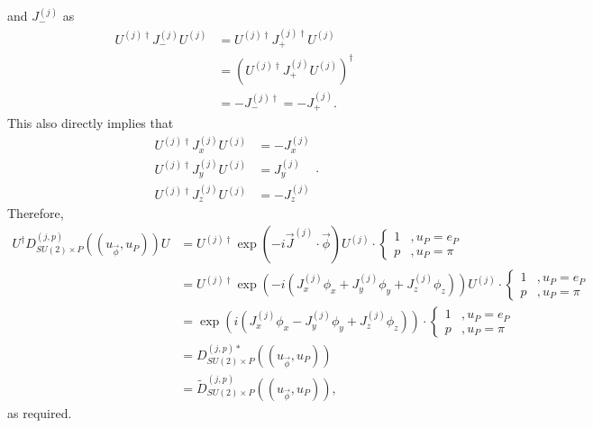 \documentclass[preprint, 12pt]{revtex4-2}
\numberwithin{equation}{section}
\begin{document}
and $J^{(j)}_-$ as
\begin{equation}\label{eq:Udagger J- U}
    \begin{aligned}
        U^{(j)\dagger}J_-^{(j)}U^{(j)} &= U^{(j)\dagger}J_+^{(j)\dagger}U^{(j)} \\
        &= \left(U^{(j)\dagger}J_+^{(j)}U^{(j)}\right)^\dagger \\
        &= -J_-^{(j)\dagger} = -J_+^{(j)}.
    \end{aligned}
\end{equation}
This also directly implies that
\begin{equation}\label{eq:Udagger Js U}
    \begin{aligned}
        U^{(j)\dagger}J_x^{(j)}U^{(j)} &= -J_x^{(j)} \\
        U^{(j)\dagger}J_y^{(j)}U^{(j)} &= J_y^{(j)} \\
        U^{(j)\dagger}J_z^{(j)}U^{(j)} &= -J_z^{(j)}
    \end{aligned}.
\end{equation}
Therefore,
\begin{equation}\label{eq:U basis theta basis equivalence}
    \begin{aligned}
        U^\dagger D_{SU(2)\times P}^{(j,p)}((u_{\vec{\phi}}, u_P))U &= U^{(j)\dagger}\exp(-i\vec{J}^{(j)}\cdot\vec{\phi})U^{(j)}\cdot \begin{cases}
            1 &, u_P = e_P \\
            p &, u_P = \pi
        \end{cases} \\ 
        &= U^{(j)\dagger}\exp(-i(J_x^{(j)}\phi_x+J_y^{(j)}\phi_y+J_z^{(j)}\phi_z))U^{(j)}\cdot \begin{cases}
            1 &, u_P = e_P \\
            p &, u_P = \pi
        \end{cases} \\
        &= \exp(i(J_x^{(j)}\phi_x-J_y^{(j)}\phi_y+J_z^{(j)}\phi_z))\cdot \begin{cases}
            1 &, u_P = e_P \\
            p &, u_P = \pi
        \end{cases} \\
        &= D_{SU(2)\times P}^{(j,p)\ast}((u_{\vec{\phi}}, u_P)) \\
        &= \tilde{D}_{SU(2)\times P}^{(j,p)}((u_{\vec{\phi}}, u_P)),
    \end{aligned}
\end{equation}
as required.
\end{document}
